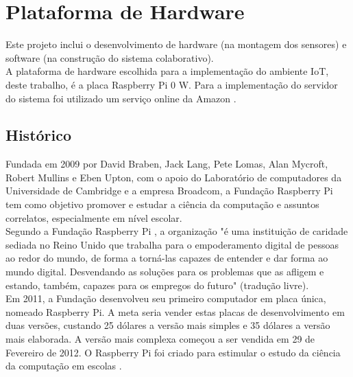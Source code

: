 \section{Plataforma de Hardware}
\label{sec:plataforma}
\quad Este projeto inclui o desenvolvimento de hardware (na montagem dos sensores) e software (na construção do sistema colaborativo).
\\\null\quad A plataforma de hardware escolhida para a implementação do ambiente \acrlong{IoT}, deste trabalho, é a placa Raspberry Pi 0 W. Para a implementação do servidor do sistema foi utilizado um serviço online da Amazon \cite{lightsail}.
\subsection{Histórico}
\quad Fundada em 2009 por David Braben, Jack Lang, Pete Lomas, Alan Mycroft, Robert Mullins e Eben Upton, com o apoio do Laboratório de computadores da Universidade de Cambridge e a empresa Broadcom, a Fundação Raspberry Pi tem como objetivo promover e estudar a ciência da computação e assuntos correlatos, especialmente em nível escolar.
\\\null\quad Segundo a Fundação Raspberry Pi \cite{rasp}, a organização "é uma instituição de caridade sediada no Reino Unido que trabalha para o empoderamento digital de pessoas ao redor do mundo,
de forma a torná-las capazes de entender e dar forma ao mundo digital. Desvendando as soluções para os
problemas que as afligem e estando, também, capazes para os empregos do futuro"  (tradução livre).
\\\null \quad Em 2011, a Fundação desenvolveu seu primeiro computador em placa única, nomeado Raspberry Pi. A meta seria vender estas placas
de desenvolvimento em duas versões, custando 25 dólares a versão mais simples e 35 dólares a versão mais elaborada. A versão mais complexa começou a ser vendida
em 29 de Fevereiro de 2012. O Raspberry Pi foi criado para estimular o estudo da ciência da computação em escolas \cite{rasp}.
